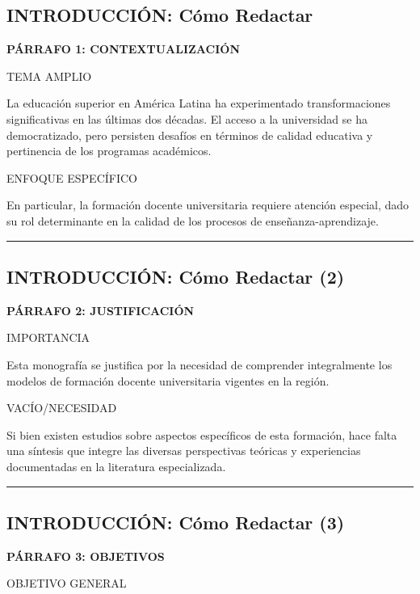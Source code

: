 \documentclass[
  11pt,
]{beaner}
\begin{document}
\subsection{INTRODUCCIÓN: Cómo
Redactar}\label{introducciuxf3n-cuxf3mo-redactar}

\textbf{PÁRRAFO 1: CONTEXTUALIZACIÓN}

{TEMA AMPLIO}

La educación superior en América Latina ha experimentado
transformaciones significativas en las últimas dos décadas. El acceso a
la universidad se ha democratizado, pero persisten desafíos en términos
de calidad educativa y pertinencia de los programas académicos.

{ENFOQUE ESPECÍFICO}

En particular, la formación docente universitaria requiere atención
especial, dado su rol determinante en la calidad de los procesos de
enseñanza-aprendizaje.

\begin{center}\rule{0.5\linewidth}{0.5pt}\end{center}

\subsection{INTRODUCCIÓN: Cómo Redactar
(2)}\label{introducciuxf3n-cuxf3mo-redactar-2}

\textbf{PÁRRAFO 2: JUSTIFICACIÓN}

{IMPORTANCIA}

Esta monografía se justifica por la necesidad de comprender
integralmente los modelos de formación docente universitaria vigentes en
la región.

{VACÍO/NECESIDAD}

Si bien existen estudios sobre aspectos específicos de esta formación,
hace falta una síntesis que integre las diversas perspectivas teóricas y
experiencias documentadas en la literatura especializada.

\begin{center}\rule{0.5\linewidth}{0.5pt}\end{center}

\subsection{INTRODUCCIÓN: Cómo Redactar
(3)}\label{introducciuxf3n-cuxf3mo-redactar-3}

\textbf{PÁRRAFO 3: OBJETIVOS}

{OBJETIVO GENERAL}
\end{document}
